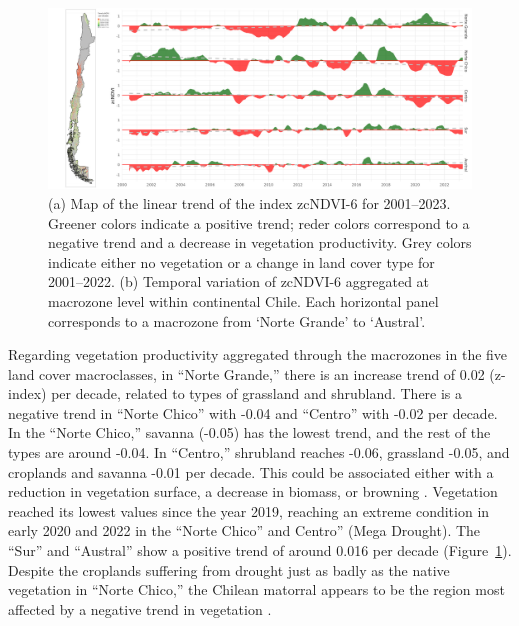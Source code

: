 \documentclass[
  authoryear,
  preprint,
  3p,
  onecolumn]{elsarticle}
\begin{document}
\begin{figure}[!ht]

{\centering \includegraphics{../output/figs/temporal_variation_zcNDVI6_macrozonas_con_mapa.png}

}

\caption{\label{fig-zcNDVI_var}(a) Map of the linear trend of the index
zcNDVI-6 for 2001--2023. Greener colors indicate a positive trend; reder
colors correspond to a negative trend and a decrease in vegetation
productivity. Grey colors indicate either no vegetation or a change in
land cover type for 2001--2022. (b) Temporal variation of zcNDVI-6
aggregated at macrozone level within continental Chile. Each horizontal
panel corresponds to a macrozone from `Norte Grande' to `Austral'.}

\end{figure}

Regarding vegetation productivity aggregated through the macrozones in
the five land cover macroclasses, in ``Norte Grande,'' there is an
increase trend of 0.02 (z-index) per decade, related to types of
grassland and shrubland. There is a negative trend in ``Norte Chico''
with -0.04 and ``Centro'' with -0.02 per decade. In the ``Norte Chico,''
savanna (-0.05) has the lowest trend, and the rest of the types are
around -0.04. In ``Centro,'' shrubland reaches -0.06, grassland -0.05,
and croplands and savanna -0.01 per decade. This could be associated
either with a reduction in vegetation surface, a decrease in biomass, or
browning \citep{Miranda2023}. Vegetation reached its lowest values since
the year 2019, reaching an extreme condition in early 2020 and 2022 in
the ``Norte Chico'' and Centro'' (Mega Drought). The ``Sur'' and
``Austral'' show a positive trend of around 0.016 per decade
(Figure~\ref{fig-zcNDVI_var}). Despite the croplands suffering from
drought just as badly as the native vegetation in ``Norte Chico,'' the
Chilean matorral appears to be the region most affected by a negative
trend in vegetation \citep{Fuentes2021}.
\end{document}
